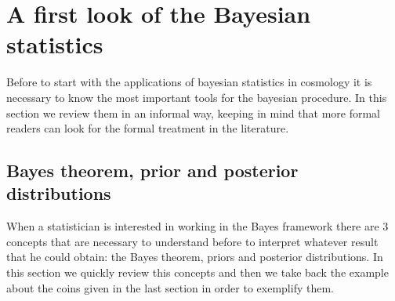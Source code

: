 \documentclass[onecolumn,           %
               showpacs,            %
               preprintnumbers,     %
               aps,                 %
               prl,          	    %
               letterpaper,             %
               superscriptaddress,      %
               nofootinbib,         %
               tightenlines,        %
               floats,floatfix      %
               ,usenatbib,
               ]{revtex4-1}
\begin{document}
\section{A first look of the Bayesian statistics}

Before to start with the applications of bayesian statistics in cosmology it is necessary to know the most important tools for the bayesian procedure. In this section we review them in an informal way, keeping in mind that more formal readers can look for the formal treatment in the literature.   

\subsection{Bayes theorem, prior and posterior distributions}\label{BTPP}

When a statistician is interested in working in the Bayes framework there are 3 concepts that are necessary to understand before to interpret whatever result that he could obtain: the Bayes theorem, priors and posterior distributions. In this section we quickly review this concepts and then we take back the example about the coins given in the last section in order to exemplify them. 
\end{document}
